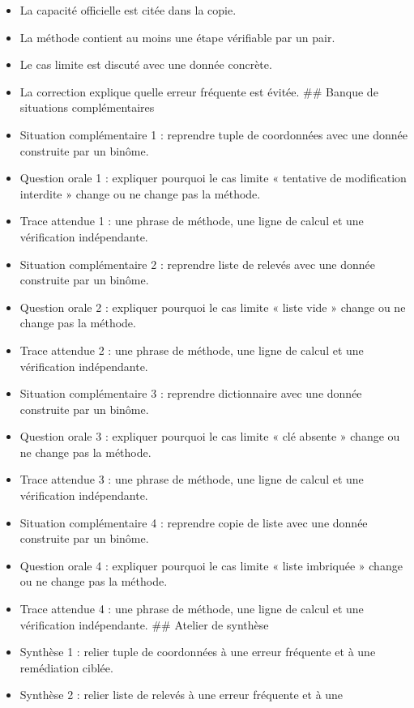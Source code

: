 \begin{itemize}
\tightlist
\item
  La capacité officielle est citée dans la copie.
\item
  La méthode contient au moins une étape vérifiable par un pair.
\item
  Le cas limite est discuté avec une donnée concrète.
\item
  La correction explique quelle erreur fréquente est évitée. \#\# Banque
  de situations complémentaires
\item
  Situation complémentaire 1 : reprendre tuple de coordonnées avec une
  donnée construite par un binôme.
\item
  Question orale 1 : expliquer pourquoi le cas limite « tentative de
  modification interdite » change ou ne change pas la méthode.
\item
  Trace attendue 1 : une phrase de méthode, une ligne de calcul et une
  vérification indépendante.
\item
  Situation complémentaire 2 : reprendre liste de relevés avec une
  donnée construite par un binôme.
\item
  Question orale 2 : expliquer pourquoi le cas limite « liste vide »
  change ou ne change pas la méthode.
\item
  Trace attendue 2 : une phrase de méthode, une ligne de calcul et une
  vérification indépendante.
\item
  Situation complémentaire 3 : reprendre dictionnaire avec une donnée
  construite par un binôme.
\item
  Question orale 3 : expliquer pourquoi le cas limite « clé absente »
  change ou ne change pas la méthode.
\item
  Trace attendue 3 : une phrase de méthode, une ligne de calcul et une
  vérification indépendante.
\item
  Situation complémentaire 4 : reprendre copie de liste avec une donnée
  construite par un binôme.
\item
  Question orale 4 : expliquer pourquoi le cas limite « liste imbriquée
  » change ou ne change pas la méthode.
\item
  Trace attendue 4 : une phrase de méthode, une ligne de calcul et une
  vérification indépendante. \#\# Atelier de synthèse
\item
  Synthèse 1 : relier tuple de coordonnées à une erreur fréquente et à
  une remédiation ciblée.
\item
  Synthèse 2 : relier liste de relevés à une erreur fréquente et à une

\end{itemize}

